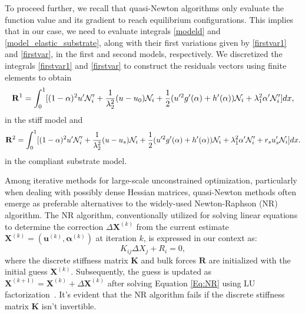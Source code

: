 To proceed further, we recall that quasi-Newton algorithms only evaluate the function value and its gradient to reach equilibrium configurations. This implies that in our case, we need to evaluate integrals \eqref{modeld} and \eqref{model_elastic_substrate}, along with their first variations given by \eqref{firstvar1} and \eqref{firstvar}, in the first and second models, respectively. We   discretized the integrals \eqref{firstvar1} and \eqref{firstvar} to construct the residuals vectors using finite elements to obtain 
\begin{equation}
{\bf R}^1=\int_0^1 [(1-\alpha)^2u'\mathcal{N}'_i+\frac{1}{\lambda_2^2} (u-u_0) \mathcal{N}_i+\frac{1}{2}(u'^2 g'(\alpha)+h'(\alpha))\mathcal{N}_i+\lambda_1^2\alpha'\mathcal{N}'_i ]dx,\label{residual1}
\end{equation}
in the stiff model and 
\begin{equation}
{\bf R}^2=\int_0^1 [(1-\alpha)^2u'\mathcal{N}'_i+\frac{1}{\lambda_2^2} (u-u_s) \mathcal{N}_i+\frac{1}{2}(u'^2 g'(\alpha)+h'(\alpha))\mathcal{N}_i+\lambda_1^2\alpha'\mathcal{N}'_i +r_su_s'\mathcal{N}_i]dx\label{residual2}.
\end{equation}
in the compliant substrate model. 

Among iterative methods for large-scale unconstrained optimization, particularly when dealing with possibly dense Hessian matrices,  quasi-Newton methods often emerge as preferable alternatives to the widely-used Newton-Raphson (NR) algorithm. The NR algorithm, conventionally utilized for solving linear equations to determine the correction $\Delta \mathbf{X}^{(k)}$ from the current estimate $\mathbf{X}^{(k)} = (\mathbf{u}^{(k)}, \boldsymbol{\alpha}^{(k)})$ at iteration $k$, is expressed in our context as:
\begin{equation}
K_{ij} \Delta X_j + R_i = 0,
\label{Eq:NR}
\end{equation}
where the discrete stiffness matrix $\mathbf{K}$ and bulk forces $\mathbf{R}$ are initialized with the initial guess $\mathbf{X}^{(k)}$. Subsequently, the guess is updated as $\mathbf{X}^{(k+1)} = \mathbf{X}^{(k)} + \Delta \mathbf{X}^{(k)}$ after solving Equation \eqref{Eq:NR} using LU factorization~\cite{Sanderson2016-ht}. It's evident that the NR algorithm fails if the discrete stiffness matrix $\mathbf{K}$ isn't invertible.

